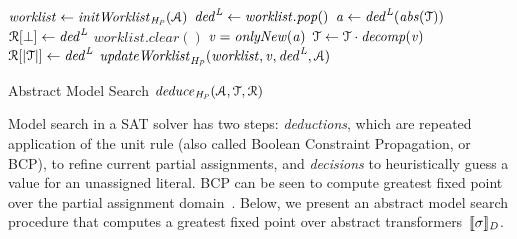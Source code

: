 \begin{algorithm2e}[t]
\DontPrintSemicolon
{}
\begin{small}
$\mathit{worklist} \leftarrow \mathit{initWorklist}_{\mathit{H_P}}(\mathcal{A})$ \;
{
  $\mathit{ded}^{\mathit{L}} \leftarrow \mathit{worklist.pop}()$ \; 
  $\mathit{a} \leftarrow \mathit{ded}^{\mathit{L}}(\mathit{abs}(\mathcal{T}))$\;
  \uIf{$\absval = \bot$} {
    $\mathcal{R}[\bot] \leftarrow \mathit{ded}^{\mathit{L}}$ \;
    $\mathit{worklist.clear}()$ \;
    \return \conflict \;
  }
  \uElse
  {
    $\mathit{v}=\mathit{onlyNew}(\mathit{a})$\;
    $\mathcal{T} \leftarrow \mathcal{T} \cdot {\mathit{decomp}}(\mathit{v})$ \; 
    $\mathcal{R}[|\mathcal{T}|] \leftarrow \mathit{ded}^{\mathit{L}}$ \;
    $\mathit{updateWorklist}_{\mathit{H_P}}(\mathit{worklist}, \mathit{v}, \mathit{ded}^{\mathit{L}},  \mathcal{A})$ \; 
  }
}
 {\return \sat}
 \return \unknown \;

\end{small}
\caption{Abstract Model Search $\mathit{deduce}_{\mathit{H_P}}(\mathcal{A},\mathcal{T},\mathcal{R})$ \label{Alg:ms}}
\end{algorithm2e}

Model search in a SAT solver has two steps: {\em deductions}, which are
repeated application of the unit rule (also called Boolean Constraint
Propagation, or BCP), to refine current partial assignments, and {\em
decisions} to heuristically guess a value for an unassigned literal.  BCP
can be seen to compute greatest fixed point over the partial assignment
domain~\cite{dhk2013-popl}.  Below, we present an abstract model search
procedure that computes a greatest fixed point over abstract
transformers~$\llbracket \sigma \rrbracket_{\mathit{D}}$.
 
%

